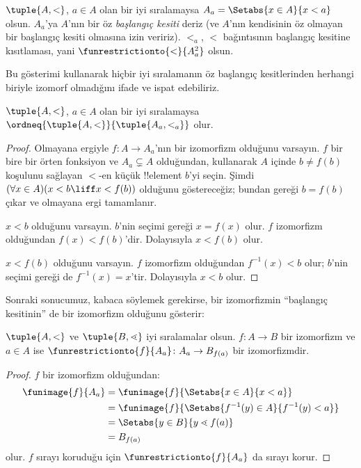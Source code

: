 \begin{defn}
$\tuple{A,<}$, $a\in A$ olan bir iyi sıralamaysa
$A_a=\Setabs{x\in A}{x<a}$ olsun. $A_a$'ya $A$'nın bir öz
\emph{başlangıç kesiti} deriz (ve $A$'nın kendisinin öz olmayan bir
başlangıç kesiti olmasına izin veririz). $<_a$, $<$ bağıntısının başlangıç
kesitine kısıtlaması, yani $\funrestrictionto{\mathord{<}}{A_a^2}$ olsun.
\end{defn}
\noindent
Bu gösterimi kullanarak hiçbir iyi sıralamanın öz başlangıç kesitlerinden
herhangi biriyle izomorf olmadığını ifade ve ispat edebiliriz.

\begin{lem}
$\tuple{A,<}$, $a\in A$ olan bir iyi sıralamaysa
$\ordneq{\tuple{A,<}}{\tuple{A_a,<_a}}$ olur.
\end{lem}

\begin{proof}
Olmayana ergiyle $f\colon A\to A_a$'nın bir izomorfizm olduğunu varsayın.
$f$ bir bire bir örten fonksiyon ve $A_a\subsetneq A$ olduğundan,
 kullanarak $A$ içinde $b\neq f(b)$ koşulunu
sağlayan $<$-en küçük !!{element} $b$'yi seçin. Şimdi
$(\forall x\in A)(x<b\liff x<f(b))$ olduğunu göstereceğiz; bundan
 gereği
$b=f(b)$ çıkar ve olmayana ergi tamamlanır.

$x<b$ olduğunu varsayın. $b$'nin seçimi gereği $x=f(x)$ olur. $f$
izomorfizm olduğundan $f(x)<f(b)$'dir. Dolayısıyla $x<f(b)$ olur.

$x<f(b)$ olduğunu varsayın. $f$ izomorfizm olduğundan $f^{-1}(x)<b$ olur;
$b$'nin seçimi gereği de $f^{-1}(x)=x$'tir. Dolayısıyla $x<b$ olur.
\end{proof}

Sonraki sonucumuz, kabaca söylemek gerekirse, bir izomorfizmin ``başlangıç
kesitinin'' de bir izomorfizm olduğunu gösterir:

\begin{lem}
$\tuple{A,<}$ ve $\tuple{B,\lessdot}$ iyi sıralamalar olsun.
$f\colon A\to B$ bir izomorfizm ve $a\in A$ ise
$\funrestrictionto{f}{A_a}\colon A_a\to B_{f(a)}$ bir izomorfizmdir.
\end{lem}

\begin{proof}
$f$ bir izomorfizm olduğundan:
\begin{align*}
	\funimage{f}{A_a} &= \funimage{f}{\Setabs{x \in A}{x < a}}\\
	&= \funimage{f}{\Setabs{f^{-1}(y) \in A}{f^{-1}(y) < a}} \\
	&= \Setabs{y \in B}{y \lessdot f(a)} \\
	&=B_{f(a)}
\end{align*}
olur. $f$ sırayı koruduğu için $\funrestrictionto{f}{A_a}$ da sırayı korur.
\end{proof}

